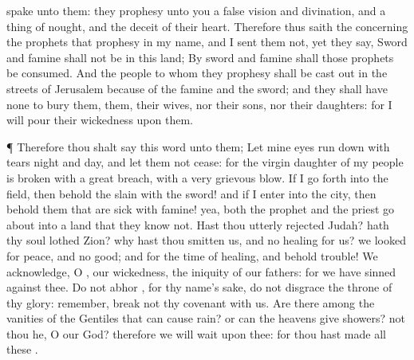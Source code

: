{spake unto them: they
prophesy unto you a
false
vision and
divination, and a thing of
nought, and the
deceit of their
heart.
Therefore thus
saith the
{} concerning the
prophets that
prophesy in my
name, and I
sent them not, yet they
say,
Sword and
famine shall not be in this
land; By
sword and
famine shall those
prophets be
consumed.
And the
people to whom they
prophesy shall be cast
out in the
streets of
Jerusalem
because of the
famine and the
sword; and they shall have none to
bury
them, them, their
wives, nor their
sons, nor their
daughters: for I will
pour their
wickedness upon them.
\par }{\PP {}¶ Therefore thou shalt
say this
word unto them; Let mine
eyes run
down with
tears
night and
day, and let them not
cease: for the
virgin
daughter of my
people is
broken with a
great
breach, with a
very
grievous
blow.
If I go
forth into the
field, then behold the
slain with the
sword! and if I
enter into the
city, then behold them that are
sick with
famine! yea, both the
prophet and the
priest go
about into a
land that they
know not.
Hast thou
utterly
rejected
Judah? hath thy
soul
lothed
Zion? why hast thou
smitten us, and
{} no
healing for us? we
looked for
peace, and
{} no
good; and for the
time of
healing, and behold
trouble!
We
acknowledge, O
{}, our
wickedness,
{} the
iniquity of our
fathers: for we have
sinned against thee.
Do not
abhor
{}, for thy
name’s sake, do not
disgrace the
throne of thy
glory:
remember,
break not thy
covenant with us.
Are
there
{} among the
vanities of the
Gentiles that can cause
rain? or can the
heavens
give
showers?
{} not thou he, O
{} our
God? therefore we will
wait upon thee: for thou hast
made all these
{}.

}

